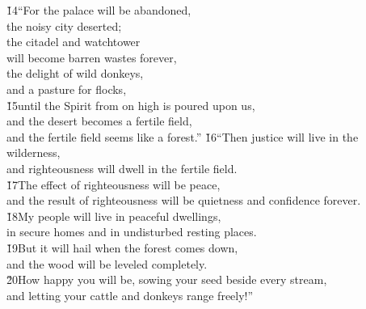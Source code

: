 \begin{poetry}
\poeml \v{14}``For the palace will be abandoned, \\
\poemll    the noisy city deserted; \\
\poeml the citadel and watchtower \\
\poemll    will become barren wastes forever, \\
\poeml the delight of wild donkeys, \\
\poemll    and a pasture for flocks, \\
\poeml \v{15}until the Spirit from on high is poured upon us, \\
\poemll    and the desert becomes a fertile field, \\
\poemlll       and the fertile field seems like a forest.''
\poeml \v{16}``Then justice will live in the wilderness, \\
\poemll    and righteousness will dwell in the fertile field. \\
\poeml \v{17}The effect of righteousness will be peace, \\
\poemll    and the result of righteousness will be quietness and confidence forever. \\
\poeml \v{18}My people will live in peaceful dwellings, \\
\poemll    in secure homes and in undisturbed resting places. \\
\poeml \v{19}But it will hail when the forest comes down, \\
\poemll    and the wood will be leveled completely. \\
\poeml \v{20}How happy you will be, sowing your seed beside every stream, \\
\poemll    and letting your cattle and donkeys range freely!''
\end{poetry}

